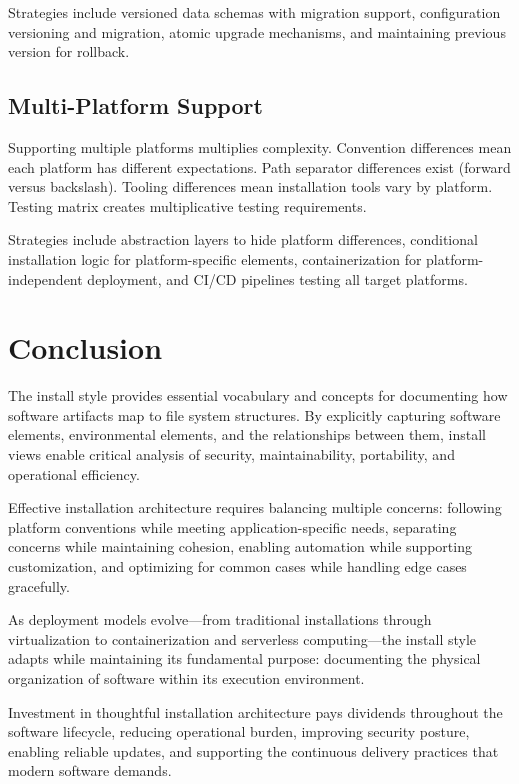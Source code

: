 \documentclass[11pt]{article}
\begin{document}
Strategies include versioned data schemas with migration support, configuration versioning and migration, atomic upgrade mechanisms, and maintaining previous version for rollback.

\subsection{Multi-Platform Support}

Supporting multiple platforms multiplies complexity. Convention differences mean each platform has different expectations. Path separator differences exist (forward versus backslash). Tooling differences mean installation tools vary by platform. Testing matrix creates multiplicative testing requirements.

Strategies include abstraction layers to hide platform differences, conditional installation logic for platform-specific elements, containerization for platform-independent deployment, and CI/CD pipelines testing all target platforms.

\section{Conclusion}

The install style provides essential vocabulary and concepts for documenting how software artifacts map to file system structures. By explicitly capturing software elements, environmental elements, and the relationships between them, install views enable critical analysis of security, maintainability, portability, and operational efficiency.

Effective installation architecture requires balancing multiple concerns: following platform conventions while meeting application-specific needs, separating concerns while maintaining cohesion, enabling automation while supporting customization, and optimizing for common cases while handling edge cases gracefully.

As deployment models evolve---from traditional installations through virtualization to containerization and serverless computing---the install style adapts while maintaining its fundamental purpose: documenting the physical organization of software within its execution environment.

Investment in thoughtful installation architecture pays dividends throughout the software lifecycle, reducing operational burden, improving security posture, enabling reliable updates, and supporting the continuous delivery practices that modern software demands.
\end{document}
